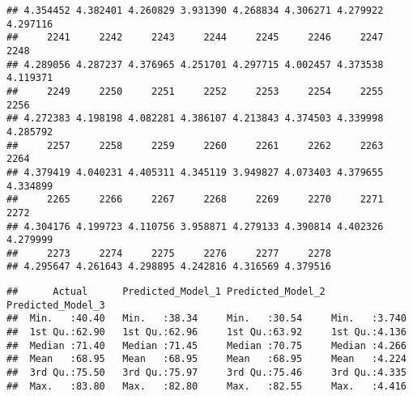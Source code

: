 \documentclass[
]{article}
\newenvironment{Shaded}{\begin{snugshade}}{\end{snugshade}}
\newcommand{\AttributeTok}[1]{\textcolor[rgb]{0.13,0.29,0.53}{#1}}
\newcommand{\CommentTok}[1]{\textcolor[rgb]{0.56,0.35,0.01}{\textit{#1}}}
\newcommand{\FunctionTok}[1]{\textcolor[rgb]{0.13,0.29,0.53}{\textbf{#1}}}
\newcommand{\NormalTok}[1]{#1}
\newcommand{\OtherTok}[1]{\textcolor[rgb]{0.56,0.35,0.01}{#1}}
\newcommand{\SpecialCharTok}[1]{\textcolor[rgb]{0.81,0.36,0.00}{\textbf{#1}}}
\begin{document}
\begin{verbatim}
## 4.354452 4.382401 4.260829 3.931390 4.268834 4.306271 4.279922 4.297116 
##     2241     2242     2243     2244     2245     2246     2247     2248 
## 4.289056 4.287237 4.376965 4.251701 4.297715 4.002457 4.373538 4.119371 
##     2249     2250     2251     2252     2253     2254     2255     2256 
## 4.272383 4.198198 4.082281 4.386107 4.213843 4.374503 4.339998 4.285792 
##     2257     2258     2259     2260     2261     2262     2263     2264 
## 4.379419 4.040231 4.405311 4.345119 3.949827 4.073403 4.379655 4.334899 
##     2265     2266     2267     2268     2269     2270     2271     2272 
## 4.304176 4.199723 4.110756 3.958871 4.279133 4.390814 4.402326 4.279999 
##     2273     2274     2275     2276     2277     2278 
## 4.295647 4.261643 4.298895 4.242816 4.316569 4.379516
\end{verbatim}

\begin{Shaded}
\end{Shaded}

\begin{verbatim}
##      Actual      Predicted_Model_1 Predicted_Model_2 Predicted_Model_3
##  Min.   :40.40   Min.   :38.34     Min.   :30.54     Min.   :3.740    
##  1st Qu.:62.90   1st Qu.:62.96     1st Qu.:63.92     1st Qu.:4.136    
##  Median :71.40   Median :71.45     Median :70.75     Median :4.266    
##  Mean   :68.95   Mean   :68.95     Mean   :68.95     Mean   :4.224    
##  3rd Qu.:75.50   3rd Qu.:75.97     3rd Qu.:75.46     3rd Qu.:4.335    
##  Max.   :83.80   Max.   :82.80     Max.   :82.55     Max.   :4.416
\end{verbatim}
\end{document}
